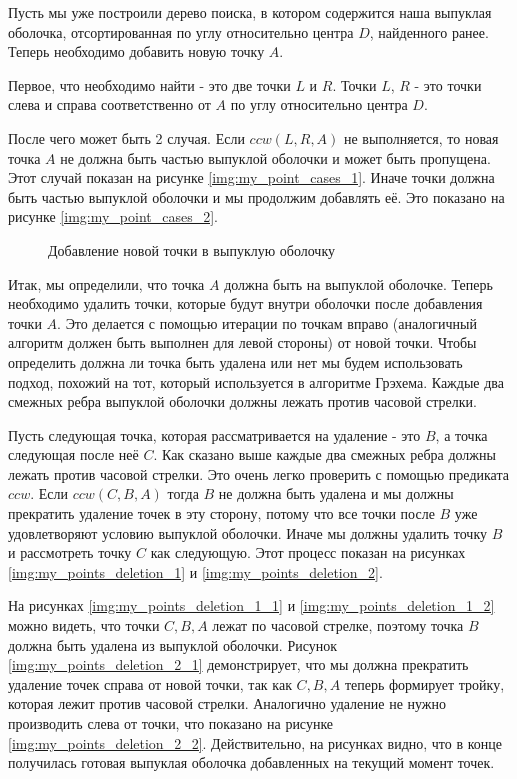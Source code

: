 Пусть мы уже построили дерево поиска, в котором содержится наша выпуклая оболочка, отсортированная по углу относительно центра $D$, найденного ранее. Теперь необходимо добавить новую точку $A$.

Первое, что необходимо найти - это две точки $L$ и $R$. Точки $L$, $R$ - это точки слева и справа соответственно от $A$ по углу относительно центра $D$.


После чего может быть 2 случая. Если $ccw(L, R, A)$ не выполняется, то новая точка $A$ не должна быть частью выпуклой оболочки и может быть пропущена. Этот случай показан на рисунке \ref{img:my_point_cases_1}. Иначе точки должна быть частью выпуклой оболочки и мы продолжим добавлять её. Это показано на рисунке \ref{img:my_point_cases_2}.

\begin{figure}[H]
	{\centering
		\hfill
		\subbottom[\label{img:my_point_cases_1}]{%
			}
		\hfill
		\subbottom[\label{img:my_point_cases_2}]{%
			}
		\hfill
	}
	\caption{Добавление новой точки в выпуклую оболочку}
	\label{img:my_point_cases}
\end{figure}

Итак, мы определили, что точка $A$ должна быть на выпуклой оболочке. Теперь необходимо удалить точки, которые будут внутри оболочки после добавления точки $A$. Это делается с помощью итерации по точкам вправо (аналогичный алгоритм должен быть выполнен для левой стороны) от новой точки. Чтобы определить должна ли точка быть удалена или нет мы будем использовать подход, похожий на тот, который используется в алгоритме Грэхема. Каждые два смежных ребра выпуклой оболочки должны лежать против часовой стрелки.

Пусть следующая точка, которая рассматривается на удаление - это $B$, а точка следующая после неё $C$. Как сказано выше каждые два смежных ребра должны лежать против часовой стрелки. Это очень легко проверить с помощью предиката $ccw$. Если $ccw(C, B, A)$ тогда $B$ не должна быть удалена и мы должны прекратить удаление точек в эту сторону, потому что все точки после $B$ уже удовлетворяют условию выпуклой оболочки. Иначе мы должны удалить точку $B$ и рассмотреть точку $C$ как следующую. Этот процесс показан на рисунках \ref{img:my_points_deletion_1} и \ref{img:my_points_deletion_2}.

На рисунках \ref{img:my_points_deletion_1_1} и \ref{img:my_points_deletion_1_2} можно видеть, что точки $C, B, A$ лежат по часовой стрелке, поэтому точка $B$ должна быть удалена из выпуклой оболочки. Рисунок \ref{img:my_points_deletion_2_1} демонстрирует, что мы должна прекратить удаление точек справа от новой точки, так как $C, B, A$ теперь формирует тройку, которая лежит против часовой стрелки. Аналогично удаление не нужно производить слева от точки, что показано на рисунке \ref{img:my_points_deletion_2_2}. Действительно, на рисунках видно, что в конце получилась готовая выпуклая оболочка добавленных на текущий момент точек.

